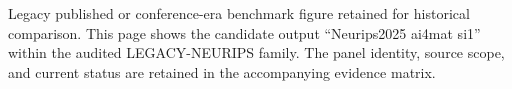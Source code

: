 Legacy published or conference-era benchmark figure retained for historical comparison. This page shows the candidate output ``Neurips2025 ai4mat si1'' within the audited LEGACY-NEURIPS family. The panel identity, source scope, and current status are retained in the accompanying evidence matrix.
